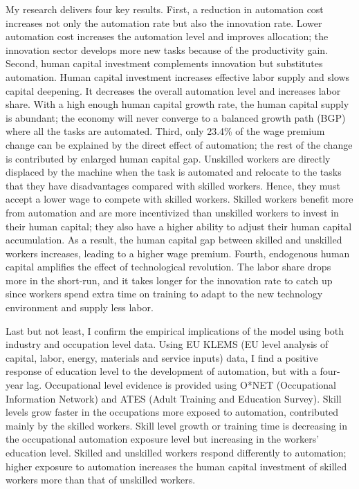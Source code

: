 \documentclass[12pt]{article}
\begin{document}
My research delivers four key results. First, a reduction in automation cost increases not only the automation rate but also the innovation rate. Lower automation cost increases the automation level and improves allocation; the innovation sector develops more new tasks because of the productivity gain. Second, human capital investment complements innovation but substitutes automation. Human capital investment increases effective labor supply and slows capital deepening. It decreases the overall automation level and increases labor share. With a high enough human capital growth rate, the human capital supply is abundant; the economy will never converge to a balanced growth path (BGP) where all the tasks are automated. Third, only 23.4\% of the wage premium change can be explained by the direct effect of automation; the rest of the change is contributed by enlarged human capital gap. Unskilled workers are directly displaced by the machine when the task is automated and relocate to the tasks that they have disadvantages compared with skilled workers. Hence, they must accept a lower wage to compete with skilled workers. Skilled workers benefit more from automation and are more incentivized than unskilled workers to invest in their human capital; they also have a higher ability to adjust their human capital accumulation. As a result, the human capital gap between skilled and unskilled workers increases, leading to a higher wage premium. Fourth, endogenous human capital amplifies the effect of technological revolution. The labor share drops more in the short-run, and it takes longer for the innovation rate to catch up since workers spend extra time on training to adapt to the new technology environment and supply less labor. 

Last but not least, I confirm the empirical implications of the model using both industry and occupation level data. Using EU KLEMS (EU level analysis of capital, labor, energy, materials and service inputs) data, I find a positive response of education level to the development of automation, but with a four-year lag. Occupational level evidence is provided using O*NET (Occupational Information Network) and ATES (Adult Training and Education Survey). Skill levels grow faster in the occupations more exposed to automation, contributed mainly by the skilled workers. Skill level growth or training time is decreasing in the occupational automation exposure level but increasing in the workers' education level. Skilled and unskilled workers respond differently to automation; higher exposure to automation increases the human capital investment of skilled workers more than that of unskilled workers. 
\end{document}

